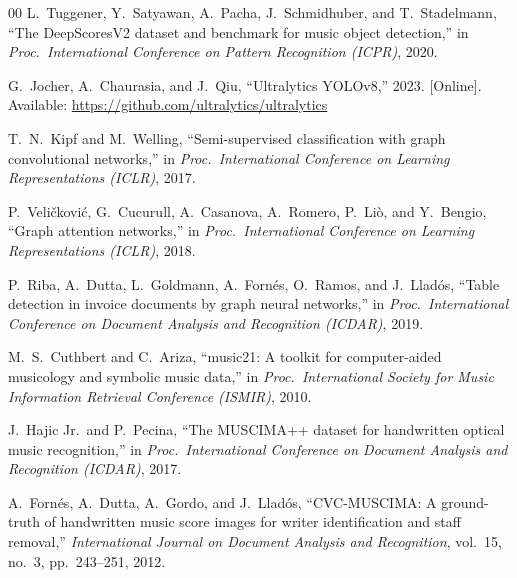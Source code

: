 \documentclass[conference]{IEEEtran}
\begin{document}
\begin{thebibliography}{00}
L.~Tuggener, Y.~Satyawan, A.~Pacha, J.~Schmidhuber, and T.~Stadelmann,
``The DeepScoresV2 dataset and benchmark for music object detection,''
in \emph{Proc.\ International Conference on Pattern Recognition (ICPR)}, 2020.

G.~Jocher, A.~Chaurasia, and J.~Qiu,
``Ultralytics YOLOv8,'' 2023. [Online]. Available:
\url{https://github.com/ultralytics/ultralytics}

T.~N.~Kipf and M.~Welling,
``Semi-supervised classification with graph convolutional networks,''
in \emph{Proc.\ International Conference on Learning Representations (ICLR)}, 2017.

P.~Veli\v{c}kovi\'c, G.~Cucurull, A.~Casanova, A.~Romero, P.~Li\`o, and
Y.~Bengio,
``Graph attention networks,''
in \emph{Proc.\ International Conference on Learning Representations (ICLR)}, 2018.

P.~Riba, A.~Dutta, L.~Goldmann, A.~Forn\'es, O.~Ramos, and J.~Llad\'os,
``Table detection in invoice documents by graph neural networks,''
in \emph{Proc.\ International Conference on Document Analysis and Recognition
(ICDAR)}, 2019.

M.~S.~Cuthbert and C.~Ariza,
``music21: A toolkit for computer-aided musicology and symbolic music data,''
in \emph{Proc.\ International Society for Music Information Retrieval
Conference (ISMIR)}, 2010.

J.~Hajic Jr.\ and P.~Pecina,
``The MUSCIMA++ dataset for handwritten optical music recognition,''
in \emph{Proc.\ International Conference on Document Analysis and Recognition
(ICDAR)}, 2017.

A.~Forn\'es, A.~Dutta, A.~Gordo, and J.~Llad\'os,
``CVC-MUSCIMA: A ground-truth of handwritten music score images for writer
identification and staff removal,''
\emph{International Journal on Document Analysis and Recognition},
vol.~15, no.~3, pp.~243--251, 2012.

\end{thebibliography}
\end{document}
